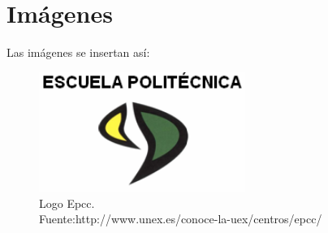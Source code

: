 \section{Imágenes}
Las imágenes se insertan así:

\begin{figure}[H]
\centering
\includegraphics[width=0.6\textwidth]{pictures/logoEpcc.png}
\caption[Logo Epcc]{Logo Epcc.\\Fuente:http://www.unex.es/conoce-la-uex/centros/epcc/}
\label{fig:logoEpcc}
\end{figure}
